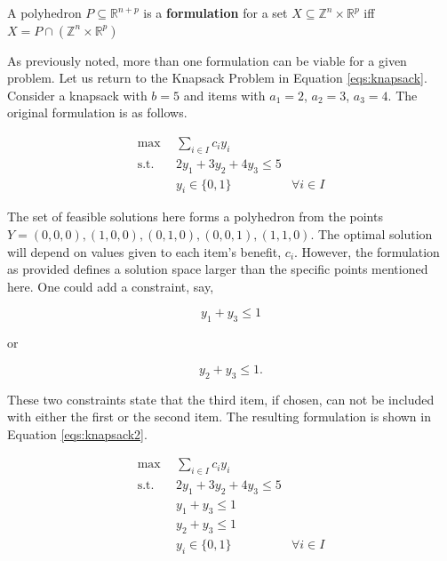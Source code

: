 \begin{define}\label{def:formulation}
A polyhedron $P \subseteq \mathbb{R}^{n+p}$ is a \textbf{formulation} for a set
$X \subseteq \mathbb{Z}^n \times \mathbb{R}^p$ iff $X = P \cap \left( 
\mathbb{Z}^n \times \mathbb{R}^p \right)$
\end{define}

As previously noted, more than one formulation can be viable for a given
problem. Let us return to the Knapsack Problem in
Equation \ref{eqs:knapsack}. Consider a knapsack with $b = 5$ and items with
$a_1 = 2$, $a_2 = 3$, $a_3 = 4$. The original formulation is as follows.

\begin{subequations}\label{eqs:knapsack1}
  \begin{align}
    \max \:\: & 
    \sum_{i \in I} c_i y_i
    & \\
    \text{s.t.} \:\: &
    2y_1 + 3y_2 + 4y_3 \leq 5 
    & \\
    &
    y_i \in \{ 0, 1 \}
    &
    \forall i \in I
  \end{align}
\end{subequations}

The set of feasible solutions here forms a polyhedron from the points $Y = {(0,
0, 0), (1, 0, 0), (0, 1, 0), (0, 0, 1), (1, 1, 0)}$. The optimal solution will
depend on values given to each item's benefit, $c_i$. However, the formulation
as provided defines a solution space larger than the specific points mentioned
here. One could add a constraint, say, 

\begin{equation*}
y_1 + y_3 \leq 1
\end{equation*}

or 

\begin{equation*}
y_2 + y_3 \leq 1.
\end{equation*}

These two constraints state that the third item, if chosen, can not be included
with either the first or the second item. The resulting formulation is shown in
Equation \ref{eqs:knapsack2}.

\begin{subequations}\label{eqs:knapsack2}
  \begin{align}
    \max \:\: & 
    \sum_{i \in I} c_i y_i
    & \\
    \text{s.t.} \:\: &
    2y_1 + 3y_2 + 4y_3 \leq 5 
    & \\
    &
    y_1 + y_3 \leq 1        
    & \\
    &
    y_2 + y_3 \leq 1        
    & \\
    &
    y_i \in \{ 0, 1 \}
    &
    \forall i \in I
  \end{align}
\end{subequations}

